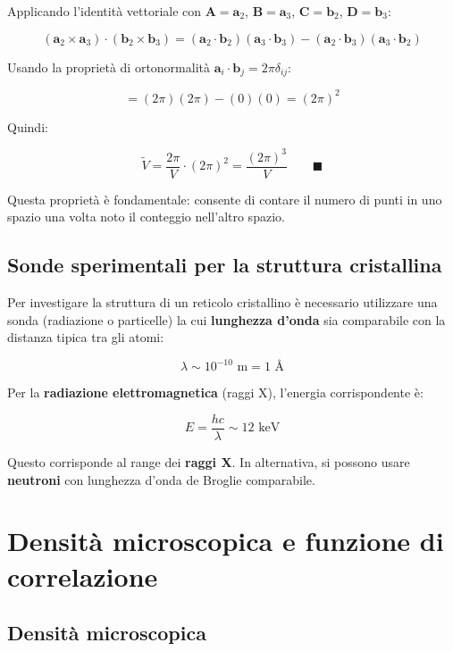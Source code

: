 Applicando l'identità vettoriale con $\mathbf{A} = \mathbf{a}_2$, $\mathbf{B} = \mathbf{a}_3$, $\mathbf{C} = \mathbf{b}_2$, $\mathbf{D} = \mathbf{b}_3$:

$$(\mathbf{a}_2 \times \mathbf{a}_3) \cdot (\mathbf{b}_2 \times \mathbf{b}_3) = (\mathbf{a}_2 \cdot \mathbf{b}_2)(\mathbf{a}_3 \cdot \mathbf{b}_3) - (\mathbf{a}_2 \cdot \mathbf{b}_3)(\mathbf{a}_3 \cdot \mathbf{b}_2)$$

Usando la proprietà di ortonormalità $\mathbf{a}_i \cdot \mathbf{b}_j = 2\pi\delta_{ij}$:

$$= (2\pi)(2\pi) - (0)(0) = (2\pi)^2$$

Quindi:

$$\tilde{V} = \frac{2\pi}{V} \cdot (2\pi)^2 = \frac{(2\pi)^3}{V} \qquad \blacksquare$$

\begin{nota}
Questa proprietà è fondamentale: consente di contare il numero di punti in uno spazio una volta noto il conteggio nell'altro spazio.
\end{nota}

\subsection*{Sonde sperimentali per la struttura cristallina}

Per investigare la struttura di un reticolo cristallino è necessario utilizzare una sonda (radiazione o particelle) la cui \textbf{lunghezza d'onda} sia comparabile con la distanza tipica tra gli atomi:

$$\lambda \sim 10^{-10} \text{ m} = 1 \text{ \AA}$$

Per la \textbf{radiazione elettromagnetica} (raggi X), l'energia corrispondente è:

$$E = \frac{hc}{\lambda} \sim 12 \text{ keV}$$

Questo corrisponde al range dei \textbf{raggi X}. In alternativa, si possono usare \textbf{neutroni} con lunghezza d'onda de Broglie comparabile.

\section{Densità microscopica e funzione di correlazione}

\subsection*{Densità microscopica}

